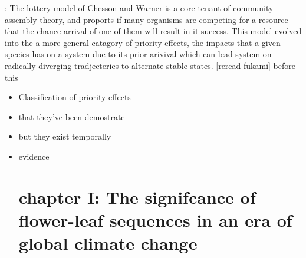 \documentclass{article}\usepackage[]{graphicx}\usepackage[]{color}
\begin{document}
: The lottery model of Chesson and Warner \citeyear{} is a core tenant of community assembly theory, and proports if many organisms are competing for a resource that the chance arrival of one of them will result in it success. This model evolved into the a more general catagory of priority effects, the impacts that a given species has on a system due to its prior arivival which can lead system on radically diverging tradjecteries to alternate stable states. [reread fukami] before this
\begin{itemize}
\item Classification of priority effects
\item that they've been demostrate
\item but they exist temporally
\item evidence
\

\section*{chapter I: The signifcance of flower-leaf sequences in an era of global climate change}

\end{itemize}
\end{document}
